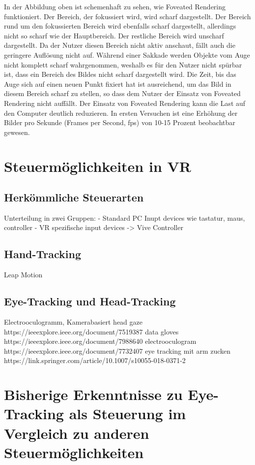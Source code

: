 In der Abbildung oben ist schemenhaft zu sehen, wie Foveated Rendering funktioniert. Der Bereich, der fokussiert wird, wird scharf dargestellt. Der Bereich rund um den fokussierten Bereich wird ebenfalls scharf dargestellt, allerdings nicht so scharf wie der Hauptbereich.  Der restliche Bereich wird unscharf dargestellt. Da der Nutzer diesen Bereich nicht aktiv anschaut, fällt auch die geringere Auflösung nicht auf. Während einer Sakkade werden Objekte vom Auge nicht komplett scharf wahrgenommen, weshalb es für den Nutzer nicht spürbar ist, dass ein Bereich des Bildes nicht scharf dargestellt wird. Die Zeit, bis das Auge sich auf einen neuen Punkt fixiert hat ist ausreichend, um das Bild in diesem Bereich scharf zu stellen, so dass dem Nutzer der Einsatz von Foveated Rendering nicht auffällt\cite{Albert.2017}. Der Einsatz von Foveated Rendering kann die Last auf den Computer deutlich reduzieren. In ersten Versuchen ist eine Erhöhung der Bilder pro Sekunde (Frames per Second, fps) von 10-15 Prozent beobachtbar gewesen\cite{H.Kim.2018}.

\section{Steuermöglichkeiten in VR}
\subsection{Herkömmliche Steuerarten}
Unterteilung in zwei Gruppen:
- Standard PC Inupt devices wie tastatur, maus, controller
- VR spezifische input devices -> Vive Controller
\subsection{Hand-Tracking}
Leap Motion
\subsection{Eye-Tracking und Head-Tracking}
Electrooculogramm, Kamerabasiert
head gaze https://ieeexplore.ieee.org/document/7519387
data gloves https://ieeexplore.ieee.org/document/7988640
electrooculogram https://ieeexplore.ieee.org/document/7732407
eye tracking mit arm zucken https://link.springer.com/article/10.1007/s10055-018-0371-2
\section{Bisherige Erkenntnisse zu Eye-Tracking als Steuerung im Vergleich zu anderen Steuermöglichkeiten}

